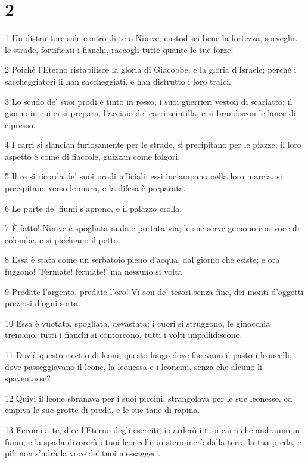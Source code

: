 \chapter{2}

\par 1 Un distruttore sale contro di te o Ninive; custodisci bene la fortezza, sorveglia le strade, fortificati i fianchi, raccogli tutte quante le tue forze!
\par 2 Poiché l'Eterno ristabilisce la gloria di Giacobbe, e la gloria d'Israele; perché i saccheggiatori li han saccheggiati, e han distrutto i loro tralci.
\par 3 Lo scudo de' suoi prodi è tinto in rosso, i suoi guerrieri veston di scarlatto; il giorno in cui ei si prepara, l'acciaio de' carri scintilla, e si brandiscon le lance di cipresso.
\par 4 I carri si slancian furiosamente per le strade, si precipitano per le piazze; il loro aspetto è come di fiaccole, guizzan come folgori.
\par 5 Il re si ricorda de' suoi prodi ufficiali; essi inciampano nella loro marcia, si precipitano verso le mura, e la difesa è preparata.
\par 6 Le porte de' fiumi s'aprono, e il palazzo crolla.
\par 7 È fatto! Ninive è spogliata nuda e portata via; le sue serve gemono con voce di colombe, e si picchiano il petto.
\par 8 Essa è stata come un serbatoio pieno d'acqua, dal giorno che esiste; e ora fuggono! 'Fermate! fermate!' ma nessuno si volta.
\par 9 Predate l'argento, predate l'oro! Vi son de' tesori senza fine, dei monti d'oggetti preziosi d'ogni sorta.
\par 10 Essa è vuotata, spogliata, devastata; i cuori si struggono, le ginocchia tremano, tutti i fianchi si contorcono, tutti i volti impallidiscono.
\par 11 Dov'è questo ricetto di leoni, questo luogo dove facevano il pasto i leoncelli, dove passeggiavano il leone, la leonessa e i leoncini, senza che alcuno li spaventasse?
\par 12 Quivi il leone sbranava per i suoi piccini, strangolava per le sue leonesse, ed empiva le sue grotte di preda, e le sue tane di rapina.
\par 13 Eccomi a te, dice l'Eterno degli eserciti; io arderò i tuoi carri che andranno in fumo, e la spada divorerà i tuoi leoncelli; io sterminerò dalla terra la tua preda, e più non s'udrà la voce de' tuoi messaggeri.

